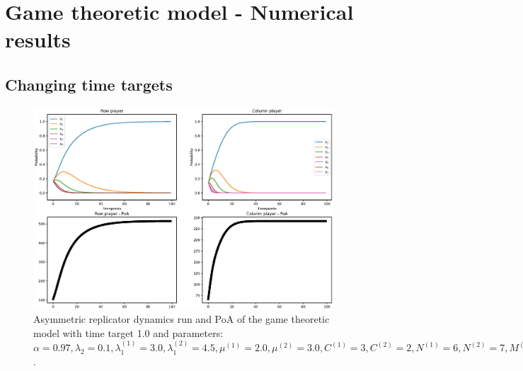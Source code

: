 \chapter{Game theoretic model - Numerical results}
\label{appendix:game_theoretic_model}

\section{Changing time targets}

\begin{figure}[H]
    \includegraphics[width=\textwidth, trim = 0 60 0 60, clip]{chapters/00_appendix/02_more_game_results/Bin/poa_ard_target_1.eps}
    \caption{Asymmetric replicator dynamics run and PoA of the game theoretic
    model with time target 1.0 and parameters: \(\alpha = 0.97,
    \lambda_2 = 0.1, \lambda_1^{(1)} = 3.0, \lambda_1^{(2)} = 4.5,
    \mu^{(1)} = 2.0, \mu^{(2)} = 3.0, C^{(1)} = 3, C^{(2)} = 2,
    N^{(1)} = 6, N^{(2)} = 7, M^{(1)} = 5, M^{(2)} = 4\).}
    \label{fig:poa_ard_target_1}
\end{figure}


